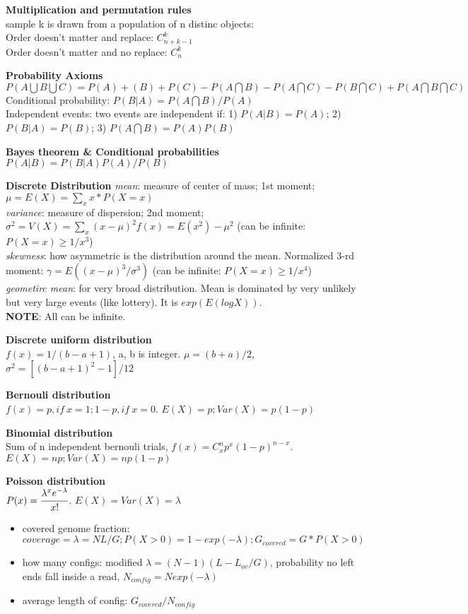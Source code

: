 \documentclass[a4paper,10pt]{article}
\begin{document}
\begin{multicols}{2}
\textbf{Multiplication and permutation rules}\\
sample k is drawn from a population of n distinc objects:\\
Order doesn't matter and replace: $C_{n+k-1}^{k}$ \\
Order doesn't matter and no replace: $C_n^k$

\textbf{Probability Axioms}\\
$P(A\bigcup B\bigcup C)=P(A)+(B)+P(C)-P(A\bigcap B)-P(A\bigcap C)-P(B\bigcap C)+P(A\bigcap B\bigcap C)$\\
Conditional probability: $P(B|A)=P(A\bigcap B)/P(A)$\\
Independent events: two events are independent if: 1) $P(A|B)=P(A)$; 2) $P(B|A)=P(B)$; 3) $P(A\bigcap B)=P(A)P(B)$

\textbf{Bayes theorem \& Conditional probabilities}\\
$P(A|B)=P(B|A)P(A)/P(B)$

\textbf{Discrete Distribution}
\textit{mean}: measure of center of mass; 1st moment; $\mu=E(X)=\sum_x x*P(X=x)$\\
\textit{variance}: measure of dispersion; 2nd moment; $\sigma^2=V(X)=\sum_x(x-\mu)^2f(x)=E(x^2)-\mu^2$ (can be infinite: $P(X=x)\ge 1/x^3$)\\
\textit{skewness}: how asymmetric is the distribution around the mean. Normalized 3-rd moment: $\gamma=E((x-\mu)^3/\sigma^3)$ (can be infinite: $P(X=x)\ge 1/x^4$)\\
\textit{geometirc mean}: for very broad distribution. Mean is dominated by very unlikely but very large events (like lottery). It is $exp(E(logX))$. \\
\textbf{NOTE}: All can be infinite.

\textbf{Discrete uniform distribution}\\
$f(x)=1/(b-a+1)$, a, b is integer. $\mu=(b+a)/2$, $\sigma^2=[(b-a+1)^2-1]/12$

\textbf{Bernouli distribution}\\
$f(x)=p,if\ x=1;1-p,if\ x=0$. $E(X)=p; Var(X)=p(1-p)$

\textbf{Binomial distribution}\\
Sum of n independent bernouli trials, $f(x)=C_x^np^x(1-p)^{n-x}$. $E(X)=np;Var(X)=np(1-p)$

\textbf{Poisson distribution}\\
$P(x)=\cfrac{\lambda^xe^{-\lambda}}{x!}$. $E(X)=Var(X)=\lambda$
\begin{itemize}
\item covered genome fraction: $coverage=\lambda=NL/G; P(X>0)=1-exp(-\lambda);G_{covered}=G*P(X>0)$
\item how many configs: modified $\lambda=(N-1)(L-L_{ov}/G)$, probability no left ends fall inside a read, $N_{config}=Nexp(-\lambda)$
\item average length of config: $G_{covered}/N_{config}$
\end{itemize}


\end{multicols}
\end{document}
